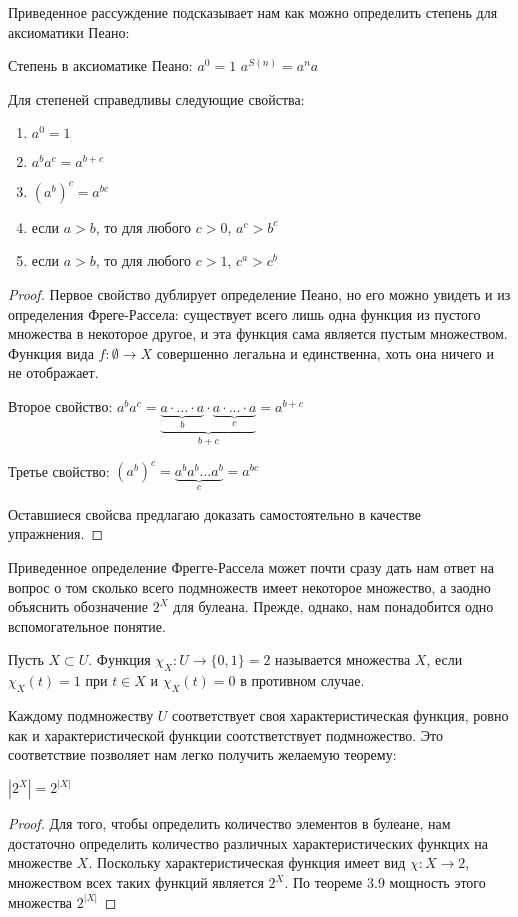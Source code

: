 Приведенное рассуждение подсказывает нам как можно определить степень для аксиоматики Пеано:

\begin{definition}
Степень в аксиоматике Пеано:\newline
$a^0 = 1$\newline
$a^{S(n)} = a^na$
\end{definition}

\begin{thm}
Для степеней справедливы следующие свойства:
\begin{enumerate}
\item $a^0 = 1$
\item $a^b a^c = a^{b+c}$
\item $(a^b)^c = a^{bc}$
\item если $a > b$, то для любого $c > 0$, $a^c > b^c$
\item если $a > b$, то для любого $c > 1$, $c^a > c^b$
\end{enumerate}
\end{thm}
\begin{proof}
Первое свойство дублирует определение Пеано, но его можно увидеть и из определения Фреге-Рассела: существует всего лишь одна функция из пустого множества в некоторое другое, и эта функция сама является пустым множеством. Функция вида $f:\emptyset\to X$ совершенно легальна и единственна, хоть она ничего и не отображает.

Второе свойство: $a^ba^c = \underbrace{\underbrace{a\cdot\ldots\cdot a}_b \cdot \underbrace{a \cdot\ldots \cdot a}_c}_{b+c} = a^{b+c}$

Третье свойство: $(a^b)^c = \underbrace{a^ba^b\ldots a^b}_c = a^{bc}$

Оставшиеся свойсва предлагаю доказать самостоятельно в качестве упражнения.
\end{proof}

Приведенное определение Фрегге-Рассела может почти сразу дать нам ответ на вопрос о том сколько всего подмножеств имеет некоторое множество, а заодно объяснить обозначение $2^X$ для булеана. Прежде, однако, нам понадобится одно вспомогательное понятие.

\begin{definition}
Пусть $X\subset U$. Функция $\chi_X: U\to \{0,1\} = 2$ называется  множества $X$, если $\chi_X(t) = 1$ при $t\in X$ и $\chi_X(t) = 0$ в противном случае.
\end{definition}

Каждому подмножеству $U$ соответствует своя характеристическая функция, ровно как и характеристической функции соотстветствует подмножество. Это соответствие позволяет нам легко получить желаемую теорему:

\begin{thm}
$|2^X| = 2^{|X|}$
\end{thm}
\begin{proof}
Для того, чтобы определить количество элементов в булеане, нам достаточно определить количество различных характеристических функцих на множестве $X$. Поскольку характеристическая функция имеет вид $\chi:X\to 2$, множеством всех таких функций является $2^X$. По теореме 3.9 мощность этого множества $2^{|X|}$
\end{proof}